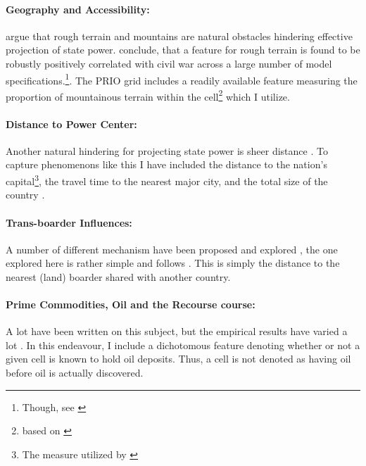 \documentclass[a4paper]{article}
\begin{document}
\paragraph{Geography and Accessibility:} \cite{Fearon_Laitin_2003} argue that rough terrain and mountains are natural obstacles hindering effective projection of state power. \cite{Hegre_Sambanis_2006} conclude, that a feature for rough terrain is found to be robustly positively correlated with civil war across a large number of model specifications.\cite[526-529]{Hegre_Sambanis_2006}\footnote{Though, see \cite{Goldstone_2010}}. The PRIO grid includes a readily available feature measuring the proportion of mountainous terrain within the cell\footnote{based on \cite{Blyth_2002}} which I utilize.\par

\paragraph{Distance to Power Center:} Another natural hindering for projecting state power is sheer distance \citep{Fearon_2004, Buhaug_Gates_Lujala_2009, Cederman_Buhaug_Roed_2009, Buhaug_2010}. To capture phenomenons like this I have included the distance to the nation's capital\footnote{The measure utilized by \cite{Buhaug_2010}}, the travel time to the nearest major city, and the total size of the country \citep{prio_code_2015}.\par

\paragraph{Trans-boarder Influences:} A number of different mechanism have been proposed and explored \citep[29-30]{Blattman_Miguel_2010}, the one explored here is rather simple and follows \cite{Hegre_Sambanis_2006}. This is simply the distance to the nearest (land) boarder shared with another country.\par 

\paragraph{Prime Commodities, Oil and the Recourse course:} A lot have been written on this subject, but the empirical results have varied a lot \citep{Collier_Hoeffler_1998, Fearon_Laitin_2003, Fearon_2004, Ross_2004, Collier_Hoeffler_2004, Fearon_2005, Buhaug_2010, Hegre_Oestby_Raleigh_2009}. In this endeavour, I include a dichotomous feature denoting whether or not a given cell is known to hold oil deposits. Thus, a cell is not denoted as having oil before oil is actually discovered.\par
\end{document}

